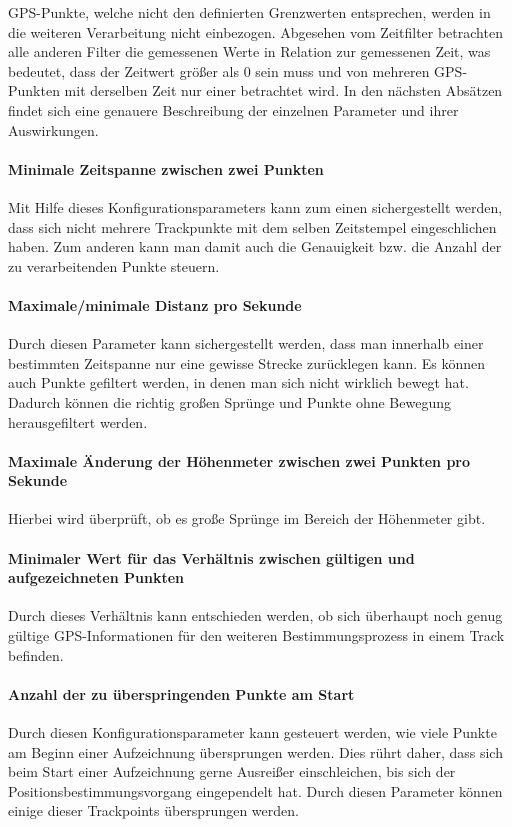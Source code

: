 GPS-Punkte, welche nicht den definierten Grenzwerten entsprechen, werden in die weiteren Verarbeitung nicht einbezogen. Abgesehen vom Zeitfilter betrachten alle anderen Filter die gemessenen Werte in Relation zur gemessenen Zeit, was bedeutet, dass der Zeitwert größer als 0 sein muss und von mehreren GPS-Punkten mit derselben Zeit nur einer betrachtet wird. In den nächsten Absätzen findet sich eine genauere Beschreibung der einzelnen Parameter und ihrer Auswirkungen.

\paragraph{Minimale Zeitspanne zwischen zwei Punkten} Mit Hilfe dieses Konfigurationsparameters kann zum einen sichergestellt werden, dass sich nicht mehrere Trackpunkte mit dem selben Zeitstempel eingeschlichen haben. Zum anderen kann man damit auch die Genauigkeit bzw. die Anzahl der zu verarbeitenden Punkte steuern.

\paragraph{Maximale/minimale Distanz pro Sekunde} Durch diesen Parameter kann sichergestellt werden, dass man innerhalb einer bestimmten Zeitspanne nur eine gewisse Strecke zurücklegen kann. Es können auch Punkte gefiltert werden,  in denen man sich nicht wirklich bewegt hat. Dadurch können die richtig großen Sprünge und Punkte ohne Bewegung herausgefiltert werden.

\paragraph{Maximale Änderung der Höhenmeter zwischen zwei Punkten pro Sekunde} Hierbei wird überprüft, ob es große Sprünge im Bereich der Höhenmeter gibt. 

\paragraph{Minimaler Wert für das Verhältnis zwischen gültigen und aufgezeichneten Punkten} Durch dieses Verhältnis kann entschieden werden, ob sich überhaupt noch genug gültige GPS-Informationen für den weiteren Bestimmungsprozess in einem Track befinden.

\paragraph{Anzahl der zu überspringenden Punkte am Start} Durch diesen Konfigurationsparameter kann gesteuert werden, wie viele Punkte am Beginn einer Aufzeichnung übersprungen werden. Dies rührt daher, dass sich beim Start einer Aufzeichnung gerne Ausreißer einschleichen, bis sich der Positionsbestimmungsvorgang eingependelt hat. Durch diesen Parameter können einige dieser Trackpoints übersprungen werden.

